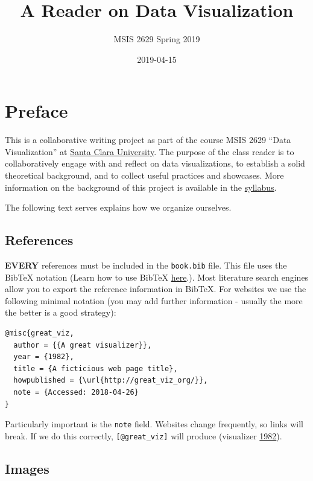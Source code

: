 \documentclass[]{book}
\title{A Reader on Data Visualization}
\author{MSIS 2629 Spring 2019}
\date{2019-04-15}
\begin{document}
\maketitle

{
\setcounter{tocdepth}{1}
\tableofcontents
}
\hypertarget{preface}{%
\chapter{Preface}\label{preface}}

This is a collaborative writing project as part of the course MSIS 2629 ``Data Visualization'' at \href{http://www.scu.edu}{Santa Clara University}. The purpose of the class reader is to collaboratively engage with and reflect on data visualizations, to establish a solid theoretical background, and to collect useful practices and showcases. More information on the background of this project is available in the \href{https://mschermann.github.io/msis2629spring2019}{syllabus}.

The following text serves explains how we organize ourselves.

\hypertarget{references}{%
\section{References}\label{references}}

\textbf{EVERY} references must be included in the \texttt{book.bib} file. This file uses the BibTeX notation (Learn how to use BibTeX \href{http://www.bibtex.org/Using/}{here}.). Most literature search engines allow you to export the reference information in BibTeX. For websites we use the following minimal notation (you may add further information - usually the more the better is a good strategy):

\begin{verbatim}
@misc{great_viz,
  author = {{A great visualizer}},
  year = {1982},
  title = {A ficticious web page title},
  howpublished = {\url{http://great_viz_org/}},
  note = {Accessed: 2018-04-26}
}
\end{verbatim}

Particularly important is the \texttt{note} field. Websites change frequently, so links will break. If we do this correctly, \texttt{{[}@great\_viz{]}} will produce (visualizer \protect\hyperlink{ref-great_viz}{1982}).

\hypertarget{images}{%
\section{Images}\label{images}}
\end{document}
